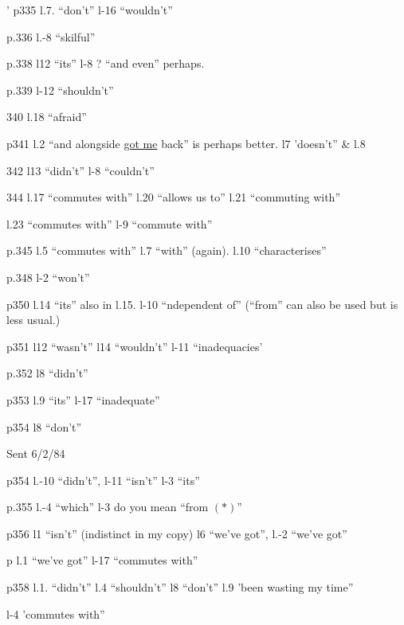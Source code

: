 
' p335 l.7. ``don't'' l-16 ``wouldn't''

p.336 l.-8 ``skilful''

p.338 l12 ``its'' l-8 ? ``and even'' perhaps.

p.339 l-12 ``shouldn't'' 

340 l.18 ``afraid''

p341 l.2 ``and alongside \uline{got me} back'' is perhaps better. l7 'doesn't'' \& l.8

342 l13 ``didn't'' l-8 ``couldn't''

344 l.17 ``commutes with'' l.20 ``allows us to'' l.21 ``commuting with''

l.23 ``commutes with'' l-9 ``commute with''

p.345 l.5 ``commutes with'' l.7 ``with'' (again). l.10 ``characterises''

p.348 l-2 ``won't''

p350 l.14 ``its'' also in l.15. l-10 ``ndependent of'' (``from'' can also be used but is less usual.)

p351 l12 ``wasn't'' l14 ``wouldn't'' l-11 ``inadequacies'

p.352 l8 ``didn't''

p353 l.9 ``its'' l-17 ``inadequate''

p354 l8 ``don't''

Sent 6/2/84


p354 l.-10 ``didn't'', l-11 ``isn't'' l-3 ``its''

p.355 l.-4 ``which'' l-3 do you mean ``from $(*)$''

p356 l1 ``isn't'' (indistinct in my copy) l6 ``we've got'',  l.-2 ``we've got''

p l.1 ``we've got''  l-17 ``commutes with''

p358 l.1. ``didn't'' l.4 ``shouldn't'' l8 ``don't'' l.9 'been wasting my time''

l-4 'commutes with''

